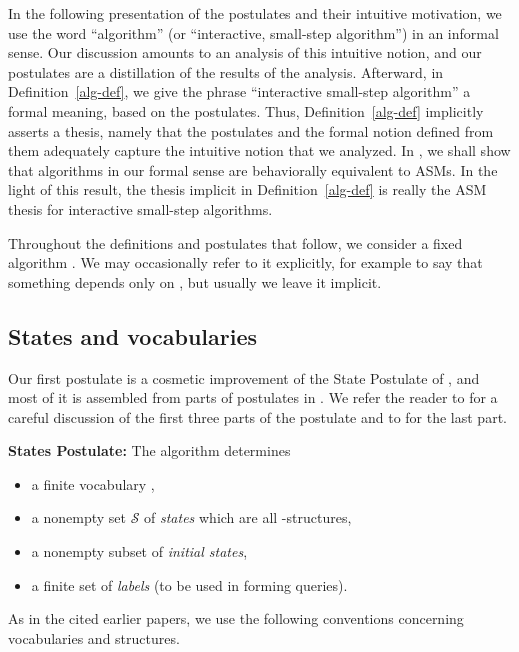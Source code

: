 \documentclass{LMCS}
\theoremstyle{definition}
\newenvironment{ls}{\begin{itemize}}{\end{itemize}}
\newenvironment{unn}[1]{\bigskip\noindent\textbf{#1}\quad}{\par\bigskip}
\newcommand{\scr}[1]{\ensuremath{\mathcal {#1}}}
\begin{document}
In the following presentation of the postulates and their intuitive
motivation, we use the word ``algorithm'' (or ``interactive,
small-step algorithm'') in an informal sense.  Our discussion amounts
to an analysis of this intuitive notion, and our postulates are a
distillation of the results of the analysis.  Afterward, in
Definition~\ref{alg-def}, we give the phrase ``interactive small-step
algorithm'' a formal meaning, based on the postulates.  Thus,
Definition~\ref{alg-def} implicitly asserts a thesis, namely that the
postulates and the formal notion defined from them adequately capture
the intuitive notion that we analyzed.  In \cite{ga2}, we shall show
that algorithms in our formal sense are behaviorally equivalent to
ASMs.  In the light of this result, the thesis implicit in
Definition~\ref{alg-def} is really the ASM thesis for interactive
small-step algorithms.

Throughout the definitions and postulates that follow, we consider a
fixed algorithm .  We may occasionally refer to it explicitly, for
example to say that something depends only on , but usually we
leave it implicit.

\subsection{States and vocabularies}

Our first postulate is a cosmetic improvement of the State Postulate of
\cite{oa1}, and most of it is assembled from parts of postulates in
\cite{seqth}.  We refer the reader to \cite{seqth} for a careful
discussion of the first three parts of the postulate and to \cite{oa1} for
the last part.

\begin{unn}{States Postulate:} The algorithm determines
\begin{ls}
\item a finite vocabulary ,
\item a nonempty set \scr S of
\emph{states} which are all -structures,
\item a nonempty subset  of \emph{initial
  states},
\item a finite set  of \emph{labels} (to be used in forming
  queries). 
\end{ls}
\end{unn}

As in the cited earlier papers, we use the following conventions
concerning vocabularies and structures.
\end{document}
